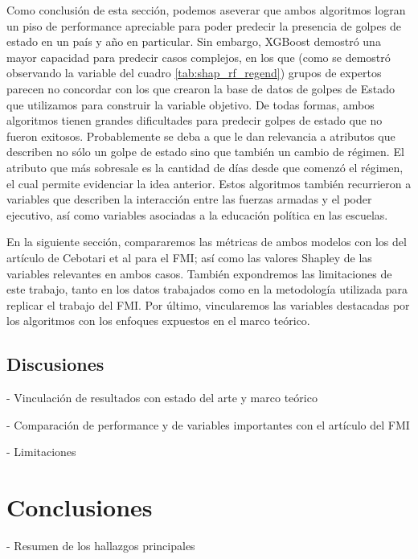 \documentclass{article}
\begin{document}
Como conclusión de esta sección, podemos aseverar que ambos algoritmos logran un piso de performance 
apreciable para poder predecir la presencia de golpes de estado en un país y año en particular. Sin 
embargo, XGBoost demostró una mayor capacidad para predecir casos complejos, en los que (como se 
demostró observando la variable del cuadro \ref{tab:shap_rf_regend}) grupos de expertos parecen no 
concordar con los que crearon la base de datos de golpes de Estado que utilizamos para construir la 
variable objetivo. De todas formas, ambos algoritmos tienen grandes dificultades para predecir golpes 
de estado que no fueron exitosos. Probablemente se deba a que le dan relevancia a atributos que 
describen no sólo un golpe de estado sino que también un cambio de régimen. El atributo que más 
sobresale es la cantidad de días desde que comenzó el régimen, el cual permite evidenciar la idea 
anterior. Estos algoritmos también recurrieron a variables que describen la interacción entre las 
fuerzas armadas y el poder ejecutivo, así como variables asociadas a la educación política en las 
escuelas. 

En la siguiente sección, compararemos las métricas de ambos modelos con los del artículo
de Cebotari et al \citeyear{Ceb24} para el FMI; así como las valores Shapley de las variables 
relevantes en ambos casos. También expondremos las limitaciones de este trabajo, tanto en los
datos trabajados como en la metodología utilizada para replicar el trabajo del FMI. Por último,
vincularemos las variables destacadas por los algoritmos con los enfoques expuestos en el marco
teórico.




\subsection{Discusiones}
- Vinculación de resultados con estado del arte y marco teórico

- Comparación de performance y de variables importantes con el artículo del FMI

- Limitaciones 

\section{Conclusiones}
- Resumen de los hallazgos principales
\end{document}
